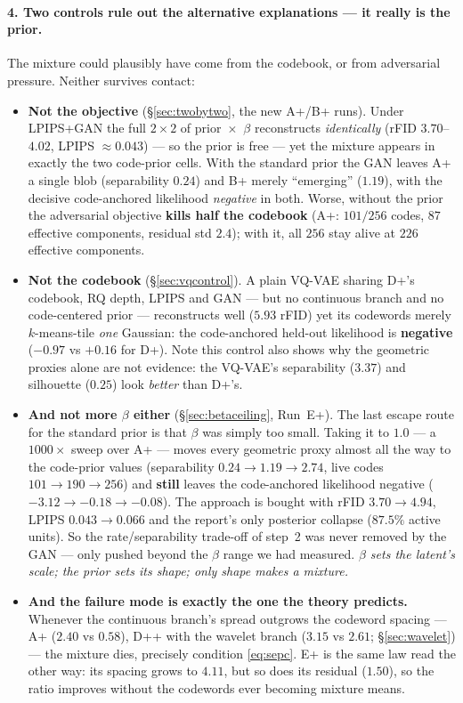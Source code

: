 \documentclass[11pt]{article}
\begin{document}
\paragraph{4. Two controls rule out the alternative explanations --- it really is the prior.}
The mixture could plausibly have come from the codebook, or from adversarial pressure. Neither
survives contact:
\begin{itemize}
  \item \textbf{Not the objective} (\S\ref{sec:twobytwo}, the new A+/B+ runs). Under LPIPS+GAN the
  full $2\times2$ of prior~$\times$~$\beta$ reconstructs \emph{identically} (rFID
  $3.70$--$4.02$, LPIPS $\approx0.043$) --- so the prior is free --- yet the mixture appears in
  exactly the two code-prior cells. With the standard prior the GAN leaves A+ a single blob
  (separability $0.24$) and B+ merely ``emerging'' ($1.19$), with the decisive code-anchored
  likelihood \emph{negative} in both. Worse, without the prior the adversarial objective
  \textbf{kills half the codebook} (A+: $101/256$ codes, $87$ effective components, residual std
  $2.4$); with it, all $256$ stay alive at $226$ effective components.
  \item \textbf{Not the codebook} (\S\ref{sec:vqcontrol}). A plain VQ-VAE sharing D+'s codebook,
  RQ depth, LPIPS and GAN --- but no continuous branch and no code-centered prior --- reconstructs
  well ($5.93$ rFID) yet its codewords merely $k$-means-tile \emph{one} Gaussian: the code-anchored
  held-out likelihood is \textbf{negative} ($-0.97$ vs $+0.16$ for D+). Note this control also shows
  why the geometric proxies alone are not evidence: the VQ-VAE's separability ($3.37$) and
  silhouette ($0.25$) look \emph{better} than D+'s.
  \item \textbf{And not more $\beta$ either} (\S\ref{sec:betaceiling}, Run~E+). The last escape
  route for the standard prior is that $\beta$ was simply too small. Taking it to $1.0$ --- a
  $1000\times$ sweep over A+ --- moves every geometric proxy almost all the way to the code-prior
  values (separability $0.24\to1.19\to2.74$, live codes $101\to190\to256$) and \textbf{still}
  leaves the code-anchored likelihood negative ($-3.12\to-0.18\to-0.08$). The approach is bought
  with rFID $3.70\to4.94$, LPIPS $0.043\to0.066$ and the report's only posterior collapse
  ($87.5\%$ active units). So the rate/separability trade-off of step~2 was never removed by the
  GAN --- only pushed beyond the $\beta$ range we had measured. \emph{$\beta$ sets the latent's
  scale; the prior sets its shape; only shape makes a mixture.}
  \item \textbf{And the failure mode is exactly the one the theory predicts.} Whenever the
  continuous branch's spread outgrows the codeword spacing --- A+ ($2.40$ vs $0.58$), D++ with the
  wavelet branch ($3.15$ vs $2.61$; \S\ref{sec:wavelet}) --- the mixture dies, precisely condition
  \eqref{eq:sepc}. E+ is the same law read the other way: its spacing grows to $4.11$, but so does
  its residual ($1.50$), so the ratio improves without the codewords ever becoming mixture means.
\end{itemize}
\end{document}
